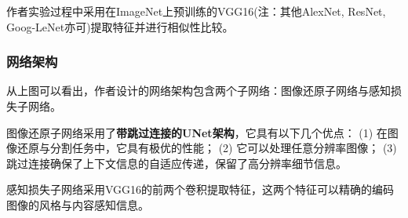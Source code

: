 \documentclass[letterpaper,12pt]{article}
\begin{document}
		作者实验过程中采用在ImageNet上预训练的VGG16(注：其他AlexNet, ResNet, Goog-LeNet亦可)提取特征并进行相似性比较。
		
		\subsubsection{网络架构}
		
		从上图可以看出，作者设计的网络架构包含两个子网络：图像还原子网络与感知损失子网络。
		
		图像还原子网络采用了\textbf{带跳过连接的UNet架构}，它具有以下几个优点：
		(1) 在图像还原与分割任务中，它具有极优的性能；
		(2) 它可以处理任意分辨率图像；
		(3) 跳过连接确保了上下文信息的自适应传递，保留了高分辨率细节信息。
		
		感知损失子网络采用VGG16的前两个卷积提取特征，这两个特征可以精确的编码图像的风格与内容感知信息。
		
\end{document}
